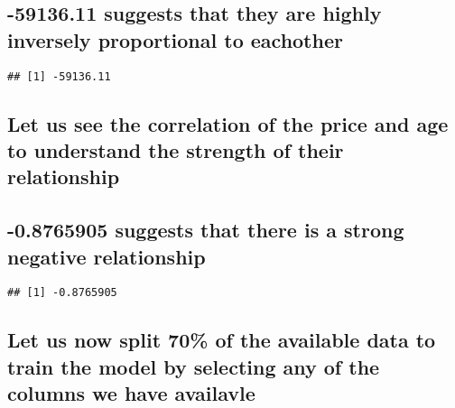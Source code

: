 \documentclass[]{article}
\newenvironment{Shaded}{\begin{snugshade}}{\end{snugshade}}
\newcommand{\KeywordTok}[1]{\textcolor[rgb]{0.13,0.29,0.53}{\textbf{#1}}}
\newcommand{\NormalTok}[1]{#1}
\newcommand{\OperatorTok}[1]{\textcolor[rgb]{0.81,0.36,0.00}{\textbf{#1}}}
\newcommand{\StringTok}[1]{\textcolor[rgb]{0.31,0.60,0.02}{#1}}
\begin{document}
\hypertarget{suggests-that-they-are-highly-inversely-proportional-to-eachother}{%
\subsection{-59136.11 suggests that they are highly inversely
proportional to
eachother}\label{suggests-that-they-are-highly-inversely-proportional-to-eachother}}

\begin{Shaded}
\end{Shaded}

\begin{verbatim}
## [1] -59136.11
\end{verbatim}

\hypertarget{let-us-see-the-correlation-of-the-price-and-age-to-understand-the-strength-of-their-relationship}{%
\subsection{Let us see the correlation of the price and age to
understand the strength of their
relationship}\label{let-us-see-the-correlation-of-the-price-and-age-to-understand-the-strength-of-their-relationship}}

\hypertarget{suggests-that-there-is-a-strong-negative-relationship}{%
\subsection{-0.8765905 suggests that there is a strong negative
relationship}\label{suggests-that-there-is-a-strong-negative-relationship}}

\begin{Shaded}
\end{Shaded}

\begin{verbatim}
## [1] -0.8765905
\end{verbatim}

\hypertarget{let-us-now-split-70-of-the-available-data-to-train-the-model-by-selecting-any-of-the-columns-we-have-availavle}{%
\subsection{Let us now split 70\% of the available data to train the
model by selecting any of the columns we have
availavle}\label{let-us-now-split-70-of-the-available-data-to-train-the-model-by-selecting-any-of-the-columns-we-have-availavle}}
\end{document}
